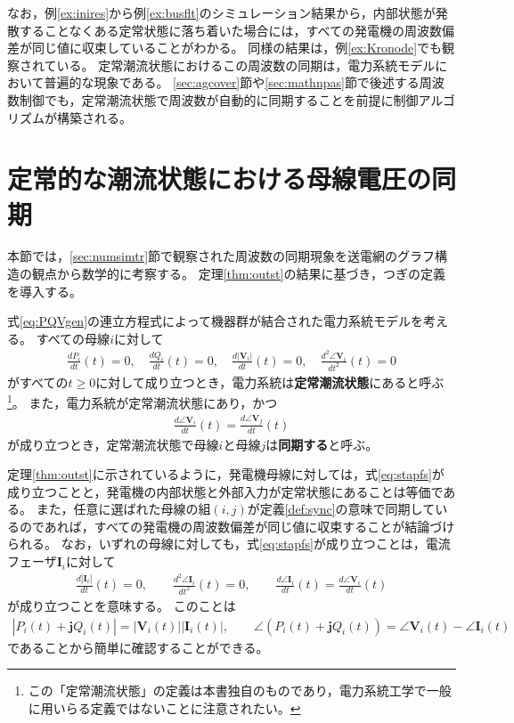 \documentclass[tombow,dvipdfmx]{corona-a5-1.1}
\begin{document}
なお，例\ref{ex:inires}から例\ref{ex:busflt}のシミュレーション結果から，内部状態が発散することなくある定常状態に落ち着いた場合には，すべての発電機の周波数偏差が同じ値に収束していることがわかる。
同様の結果は，例\ref{ex:Kronode}でも観察されている。
定常潮流状態におけるこの周波数の同期は，電力系統モデルにおいて普遍的な現象である。
\ref{sec:agcover}節や\ref{sec:mathnpas}節で後述する周波数制御でも，定常潮流状態で周波数が自動的に同期することを前提に制御アルゴリズムが構築される。

\section{定常的な潮流状態における母線電圧の同期\advanced}\label{sec:phsync}

本節では，\ref{sec:numsimtr}節で観察された周波数の同期現象を送電網のグラフ構造の観点から数学的に考察する。
定理\ref{thm:outst}の結果に基づき，つぎの定義を導入する。

\begin{定義}[定常潮流状態と母線電圧の同期]
\label{def:sync}
式\ref{eq:PQVgen}の連立方程式によって機器群が結合された電力系統モデルを考える。
すべての母線$i$に対して
\begin{align}\label{eq:stapfs}
\frac{dP_i}{dt}(t)=0
,\quad
\frac{dQ_i}{dt}(t)=0
,\quad
\frac{d|\bm{V}_i|}{dt}(t)=0
,\quad
\frac{d^2 \angle \bm{V}_i }{dt^2}(t)=0
\end{align}
がすべての$t\geq0$に対して成り立つとき，電力系統は\textbf{定常潮流状態}にあると呼ぶ
\footnote{
この「定常潮流状態」の定義は本書独自のものであり，電力系統工学で一般に用いらる定義ではないことに注意されたい。
}。
また，電力系統が定常潮流状態にあり，かつ
\begin{align}\label{eq:defsyn}
\frac{d \angle \bm{V}_i}{dt}(t) =  \frac{d \angle \bm{V}_j}{dt}(t)
\end{align}
が成り立つとき，定常潮流状態で母線$i$と母線$j$は\textbf{同期する}と呼ぶ。
\end{定義}

定理\ref{thm:outst}に示されているように，発電機母線に対しては，式\ref{eq:stapfs}が成り立つことと，発電機の内部状態と外部入力が定常状態にあることは等価である。
また，任意に選ばれた母線の組$(i,j)$が定義\ref{def:sync}の意味で同期しているのであれば，すべての発電機の周波数偏差が同じ値に収束することが結論づけられる。
なお，いずれの母線に対しても，式\ref{eq:stapfs}が成り立つことは，電流フェーザ$\bm{I}_i$に対して
\begin{align*}
\frac{d|\bm{I}_i|}{dt}(t)=0
,\qquad
\frac{d^2 \angle \bm{I}_i }{dt^2}(t)=0
,\qquad
\frac{d \angle \bm{I}_i }{dt}(t) = \frac{d \angle \bm{V}_i }{dt} (t)
\end{align*}
が成り立つことを意味する。
このことは
\begin{align*}
|P_i(t) + \bm{j} Q_i(t)| = |\bm{V}_i(t)| |\bm{I}_i(t)|
,\qquad
\angle(P_i(t) + \bm{j} Q_i(t)) = \angle \bm{V}_i(t) - \angle \bm{I}_i(t)
\end{align*}
であることから簡単に確認することができる。
\end{document}
